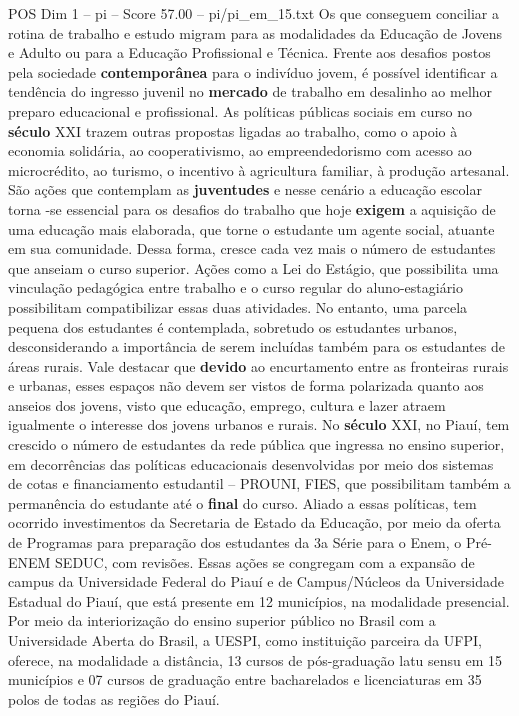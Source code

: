 \begin{textsample}{POS Dim 1 – pi – Score 57.00 – pi/pi\_em\_15.txt}
Os que conseguem conciliar a rotina de trabalho e estudo migram para as modalidades da Educação de Jovens e Adulto ou para a Educação Profissional e Técnica.
Frente aos desafios postos pela sociedade \textbf{contemporânea} para o indivíduo jovem, é possível identificar a tendência do ingresso juvenil no \textbf{mercado} de trabalho em desalinho ao melhor preparo educacional e profissional.
As políticas públicas sociais em curso no \textbf{século} XXI trazem outras propostas ligadas ao trabalho, como o apoio à economia solidária, ao cooperativismo, ao empreendedorismo com acesso ao microcrédito, ao turismo, o incentivo à agricultura familiar, à produção artesanal.
São ações que contemplam as \textbf{juventudes} e nesse cenário a educação escolar torna -se essencial para os desafios do trabalho que hoje \textbf{exigem} a aquisição de uma educação mais elaborada, que torne o estudante um agente social, atuante em sua comunidade.
Dessa forma, cresce cada vez mais o número de estudantes que anseiam o curso superior.
Ações como a Lei do Estágio, que possibilita uma vinculação pedagógica entre trabalho e o curso regular do aluno-estagiário possibilitam compatibilizar essas duas atividades.
No entanto, uma parcela pequena dos estudantes é contemplada, sobretudo os estudantes urbanos, desconsiderando a importância de serem incluídas também para os estudantes de áreas rurais.
Vale destacar que \textbf{devido} ao encurtamento entre as fronteiras rurais e urbanas, esses espaços não devem ser vistos de forma polarizada quanto aos anseios dos jovens, visto que educação, emprego, cultura e lazer atraem igualmente o interesse dos jovens urbanos e rurais.
No \textbf{século} XXI, no Piauí, tem crescido o número de estudantes da rede pública que ingressa no ensino superior, em decorrências das políticas educacionais desenvolvidas por meio dos sistemas de cotas e financiamento estudantil – PROUNI, FIES, que possibilitam também a permanência do estudante até o \textbf{final} do curso.
Aliado a essas políticas, tem ocorrido investimentos da Secretaria de Estado da Educação, por meio da oferta de Programas para preparação dos estudantes da 3a Série para o Enem, o Pré-ENEM SEDUC, com revisões.
Essas ações se congregam com a expansão de campus da Universidade Federal do Piauí e de Campus/Núcleos da Universidade Estadual do Piauí, que está presente em 12 municípios, na modalidade presencial.
Por meio da interiorização do ensino superior público no Brasil com a Universidade Aberta do Brasil, a UESPI, como instituição parceira da UFPI, oferece, na modalidade a distância, 13 cursos de pós-graduação latu sensu em 15 municípios e 07 cursos de graduação entre bacharelados e licenciaturas em 35 polos de todas as regiões do Piauí.

\end{textsample}

